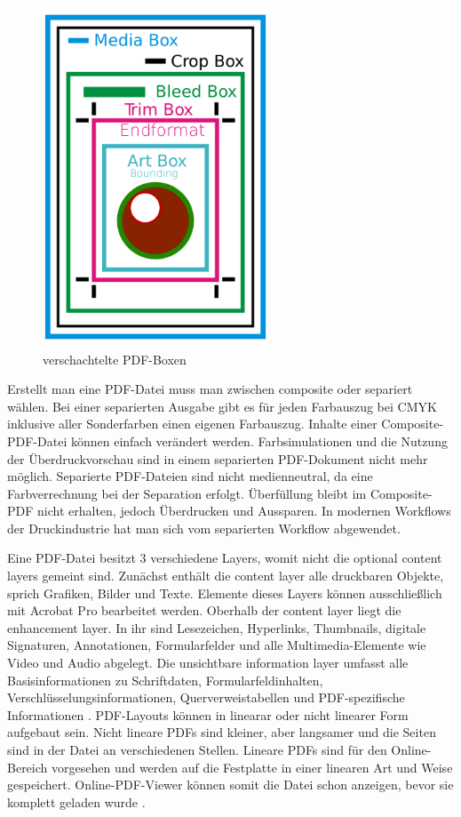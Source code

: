 \begin{figure}[!htb]
	\centering
	\includegraphics[width=0.6\textwidth]{"images/boxen-wiki-pdf-de.png"}
	\caption{verschachtelte PDF-Boxen \cite{wiki-pdf-de}}
	\label{fig:boxen}
\end{figure}

Erstellt man eine PDF-Datei muss man zwischen composite oder separiert wählen. Bei einer separierten Ausgabe gibt es für jeden Farbauszug bei CMYK inklusive aller Sonderfarben einen eigenen Farbauszug. Inhalte einer Composite-PDF-Datei können einfach verändert werden. Farbsimulationen und die Nutzung der Überdruckvorschau sind in einem separierten PDF-Dokument nicht mehr möglich. Separierte PDF-Dateien sind nicht medienneutral, da eine Farbverrechnung bei der Separation erfolgt. Überfüllung bleibt im Composite-PDF nicht erhalten, jedoch Überdrucken und Aussparen. In modernen Workflows der Druckindustrie hat man sich vom separierten Workflow abgewendet.
\par
Eine PDF-Datei besitzt 3 verschiedene Layers, womit nicht die optional content layers gemeint sind.  Zunächst enthält die content layer alle druckbaren Objekte, sprich Grafiken, Bilder und Texte. Elemente dieses Layers können ausschließlich mit Acrobat Pro bearbeitet werden. Oberhalb der content layer liegt die enhancement layer. In ihr sind Lesezeichen, Hyperlinks, Thumbnails, digitale Signaturen, Annotationen, Formularfelder und alle Multimedia-Elemente wie Video und Audio abgelegt. Die unsichtbare information layer umfasst alle Basisinformationen zu Schriftdaten, Formularfeldinhalten, Verschlüsselungsinformationen, Querverweistabellen und PDF-spezifische Informationen \cite{schneeberger}. PDF-Layouts können in linearar oder nicht linearer Form aufgebaut sein. Nicht lineare PDFs sind kleiner, aber langsamer und die Seiten sind in der Datei an verschiedenen Stellen. Lineare PDFs sind für den Online-Bereich vorgesehen und werden auf die Festplatte in einer linearen Art und Weise gespeichert. Online-PDF-Viewer können somit die Datei schon anzeigen, bevor sie komplett geladen wurde \cite{fileformat}. 

